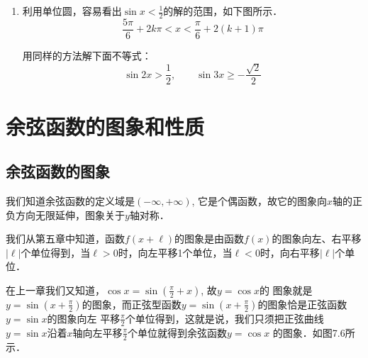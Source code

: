 \begin{enumerate}
\item 利用单位圆，容易看出$\sin x<\frac{1}{2}$的解的范围，如下图所示．
\[\frac{5\pi}{6}+2k\pi<x<\frac{\pi}{6}+2(k+1)\pi\]
\begin{center}
\end{center}


用同样的方法解下面不等式：
\[\sin 2x>\frac{1}{2},\qquad \sin 3x\ge -\frac{\sqrt{2}}{2}\]
\end{enumerate}  

\section{余弦函数的图象和性质}
\subsection{余弦函数的图象}

我们知道余弦函数的定义域是$(-\infty,+\infty)$, 它是个偶函数，故它的图象向$x$轴的正负方向无限延伸，图象关于$y$轴对称．

我们从第五章中知道，函数$f(x+\ell)$的图象是由函数$f(x)$的图象向左、右平移$|\ell|$个单位得到，当$\ell>0$时，向左平移1个单位，当$\ell<0$时，向右平移$|\ell|$个单位．

在上一章我们又知道，$\cos x=\sin\left(\frac{\pi}{2}+x\right)$,
故$y=\cos x$的
图象就是$y=\sin\left(x+\frac{\pi}{2}\right)$的图象，而正弦型函数$y=\sin\left(x+\frac{\pi}{2}\right)$的图象恰是正弦函数$y=\sin x$的图象向左
平移$\frac{\pi}{2}$个单位得到，这就是说，我们只须把正弦曲线
$y=\sin x$沿着$x$轴向左平移$\frac{\pi}{2}$个单位就得到余弦函数$y=\cos x$
的图象．如图7.6所示．

